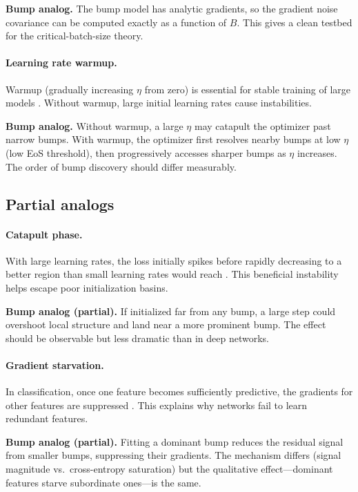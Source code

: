 \documentclass{article}
\begin{document}
\textbf{Bump analog.} The bump model has analytic gradients, so the
gradient noise covariance can be computed exactly as a function of $B$.
This gives a clean testbed for the critical-batch-size theory.

\paragraph{Learning rate warmup.}
Warmup (gradually increasing $\eta$ from zero) is essential for stable
training of large models \cite{goyal2017accurate}. Without warmup,
large initial learning rates cause instabilities.

\textbf{Bump analog.} Without warmup, a large $\eta$ may catapult the
optimizer past narrow bumps. With warmup, the optimizer first resolves
nearby bumps at low $\eta$ (low EoS threshold), then progressively
accesses sharper bumps as $\eta$ increases. The order of bump discovery
should differ measurably.

\subsection{Partial analogs}\label{sec:partial}

\paragraph{Catapult phase.}
With large learning rates, the loss initially spikes before rapidly
decreasing to a better region than small learning rates would reach
\cite{lewkowycz2020large,gilmer2022loss}. This beneficial instability
helps escape poor initialization basins.

\textbf{Bump analog (partial).} If initialized far from any bump, a
large step could overshoot local structure and land near a more
prominent bump. The effect should be observable but less dramatic than in
deep networks.

\paragraph{Gradient starvation.}
In classification, once one feature becomes sufficiently predictive, the
gradients for other features are suppressed
\cite{pezeshki2021gradient}. This explains why networks fail to learn
redundant features.

\textbf{Bump analog (partial).} Fitting a dominant bump reduces the
residual signal from smaller bumps, suppressing their gradients. The
mechanism differs (signal magnitude vs.\ cross-entropy saturation) but
the qualitative effect---dominant features starve subordinate ones---is
the same.
\end{document}
